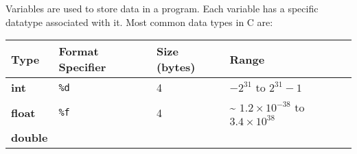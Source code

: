 \documentclass[
]{article}
\begin{document}
Variables are used to store data in a program. Each variable has a
specific datatype associated with it. Most common data types in C are:

\begin{longtable}[]{@{}llll@{}}
\toprule
\begin{minipage}[b]{0.14\columnwidth}\raggedright
Type\strut
\end{minipage} & \begin{minipage}[b]{0.13\columnwidth}\raggedright
Format Specifier\strut
\end{minipage} & \begin{minipage}[b]{0.19\columnwidth}\raggedright
Size (bytes)\strut
\end{minipage} & \begin{minipage}[b]{0.43\columnwidth}\raggedright
Range\strut
\end{minipage}\tabularnewline
\midrule
\endhead
\begin{minipage}[t]{0.14\columnwidth}\raggedright
\textbf{int}\strut
\end{minipage} & \begin{minipage}[t]{0.13\columnwidth}\raggedright
\texttt{\%d}\strut
\end{minipage} & \begin{minipage}[t]{0.19\columnwidth}\raggedright
4\strut
\end{minipage} & \begin{minipage}[t]{0.43\columnwidth}\raggedright
\(-2^{31}\) to \(2^{31}-1\)\strut
\end{minipage}\tabularnewline
\begin{minipage}[t]{0.14\columnwidth}\raggedright
\textbf{float}\strut
\end{minipage} & \begin{minipage}[t]{0.13\columnwidth}\raggedright
\texttt{\%f}\strut
\end{minipage} & \begin{minipage}[t]{0.19\columnwidth}\raggedright
4\strut
\end{minipage} & \begin{minipage}[t]{0.43\columnwidth}\raggedright
\textasciitilde{} \(1.2 \times 10^{-38}\) to
\(3.4 \times 10^{38}\)\strut
\end{minipage}\tabularnewline
\begin{minipage}[t]{0.14\columnwidth}\raggedright
\textbf{double}\strut
\end{minipage} & \begin{minipage}[t]{0.13\columnwidth}\raggedright

\end{minipage}
\end{longtable}
\end{document}
